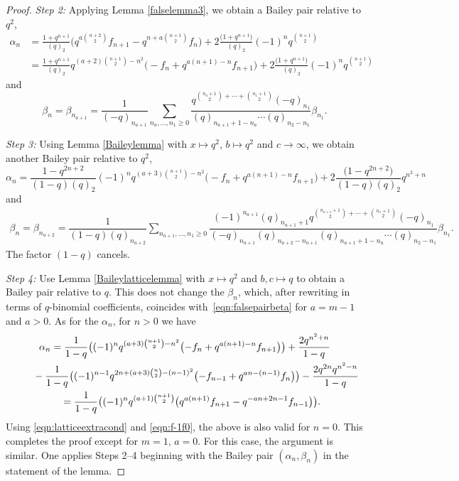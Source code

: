 \documentclass[pdftex]{sigma}
\numberwithin{equation}{section}
\begin{document}
\begin{proof}
{\it Step 2\emph{:}} Applying Lemma \ref{falselemma3}, we obtain a Bailey pair relative to $q^2$,
\begin{align*}
	\alpha_n &{}= \frac{1+q^{n+1}}{(q)_2} \bigl(q^{a\binom{n+2}{2}}f_{n+1} - q^{n + a\binom{n+1}{2}}f_n \bigr) + 2\frac{\bigl(1+q^{n+1}\bigr)}{(q)_2}(-1)^nq^{\binom{n+1}{2}} \\
	&{}= \frac{1+q^{n+1}}{(q)_2}q^{(a+2)\binom{n+1}{2} - n^2} \bigl(-f_n + q^{a(n+1)-n}f_{n+1} \bigr) + 2\frac{\bigl(1+q^{n+1}\bigr)}{(q)_2}(-1)^nq^{\binom{n+1}{2}}
\end{align*}
and
\begin{equation*}
	\beta_n=\beta_{n_{a+1}}=
	\dfrac{1}{(-q)_{n_{a+1}}}\sum_{n_a,\dots,n_1\geq 0}
	\dfrac{q^{\binom{n_a+1}{2}+\cdots+\binom{n_1+1}{2}}(-q)_{n_1}}{(q)_{n_{a+1}+1-n_a}\cdots (q)_{n_2-n_1}}\beta_{n_1}.
\end{equation*}



{\it Step 3\emph{:}} Using Lemma \ref{Baileylemma} with $x \mapsto q^2$, $b \mapsto q^2$ and $c \to \infty$, we obtain another Bailey pair relative to $q^2$,
\begin{equation*}
	\alpha_n = \frac{1-q^{2n+2}}{(1-q)(q)_2}(-1)^nq^{(a+3)\binom{n+1}{2} - n^2} \bigl(-f_n + q^{a(n+1)-n}f_{n+1} \bigr) + 2\frac{\bigl(1-q^{2n+2}\bigr)}{(1-q)(q)_2}q^{n^2+n}
\end{equation*}
and
\begin{gather*}
	\beta_n=\beta_{n_{a+2}}=
	\dfrac{1}{(1-q)(q)_{n_{a+2}}}\sum_{n_{a+1},\dots,n_1\geq 0}\!
	\dfrac{(-1)^{n_{a+1}}(q)_{n_{a+1}+1}q^{\binom{n_{a+1}+1}{2}+\cdots+\binom{n_1+1}{2}}(-q)_{n_1}}{(-q)_{n_{a+1}}(q)_{n_{a+2} - n_{a+1}}(q)_{n_{a+1}+1-n_a}\cdots (q)_{n_2-n_1}}\beta_{n_1}.
\end{gather*}
The factor $(1-q)$ cancels.

{\it Step 4\emph{:}} Use Lemma \ref{Baileylatticelemma} with $x \mapsto q^2$ and $b,c \mapsto q$ to obtain a Bailey pair relative to $q$. This does not change the $\beta_n$, which, after rewriting in terms of $q$-binomial coefficients, coincides with~\eqref{eqn:falsepairbeta} for $a = m-1$ and $a>0$. As for the $\alpha_n$, for $n > 0$ we have
\begin{gather*}
	\alpha_n = \frac{1}{1-q}\bigl((-1)^nq^{(a+3)\binom{n+1}{2} - n^2}\bigl(-f_n + q^{a(n+1)-n}f_{n+1}\bigr)\bigr) + \frac{2q^{n^2+n}}{1-q} \\
	\hphantom{\alpha_n =}{} - \frac{1}{1-q}\bigl((-1)^{n-1}q^{2n+(a+3)\binom{n}{2} - (n-1)^2}\bigl(-f_{n-1} + q^{an-(n-1)}f_n\bigr)\bigr) - \frac{2q^{2n}q^{n^2-n}}{1-q}\\
	\hphantom{\alpha_n}{} = \frac{1}{1-q}\bigl((-1)^nq^{(a+1)\binom{n+1}{2}}\bigl(q^{a(n+1)}f_{n+1} - q^{-an+2n-1}f_{n-1}\bigr)\bigr).
\end{gather*}
Using \eqref{eqn:latticeextracond} and \eqref{eqn:f-1f0}, the above is also valid for $n=0$. This completes the proof except for ${m=1}$, ${a=0}$. For this case, the argument is similar. One applies Steps 2--4 beginning with the Bailey pair $(\alpha_n,\beta_n)$ in the statement of the lemma.
\end{proof}
\end{document}
